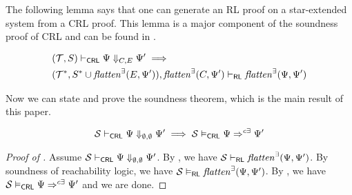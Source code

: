 The following lemma says that one can generate an RL proof on a star-extended system
from a CRL proof.
This lemma is a major component of the soundness proof of CRL and can be found in .
\begin{lemma}\label{lem:CRLalmostSoundness}
    \begin{align*}
        & (\mathcal{T}, S) \vdash_{\mathsf{CRL}} \Psi \Downarrow_{C,E} \Psi^\prime \implies \\
        &
        (\mathcal{T}^*, S^* \cup \mathit{flatten}^\exists(E, \Psi^\prime)), \mathit{flatten}^\exists(C, \Psi^\prime) \vdash_{\mathsf{RL}}
          \mathit{flatten}^\exists(\Psi, \Psi^\prime) 
    \end{align*}
\end{lemma}

Now we can state and prove the soundness theorem, which is the main result of this paper.
\begin{theorem}\label{thm:proofsystemSoundness}
\begin{equation*}
    \mathcal{S} \vdash_{\mathsf{CRL}} \Psi \Downarrow_{\emptyset,\emptyset} \Psi^\prime \implies
    \mathcal{S} \vDash_{\mathsf{CRL}} \Psi \Rightarrow^{c\exists} \Psi^\prime
\end{equation*}
\end{theorem}
\begin{proof}[Proof of ]
Assume $\mathcal{S} \vdash_{\mathsf{CRL}} \Psi \Downarrow_{\emptyset,\emptyset} \Psi^\prime$.
By , we have $\mathcal{S} \vdash_{\mathsf{RL}} \mathit{flatten}^\exists(\Psi, \Psi^\prime)$.
By soundness of reachability logic, we have $\mathcal{S} \vDash_{\mathsf{RL}} \mathit{flatten}^\exists(\Psi, \Psi^\prime)$.
By , 
we have $\mathcal{S} \vDash_{\mathsf{CRL}} \Psi \Rightarrow^{c\exists} \Psi^\prime$ and we are done.
\end{proof}



